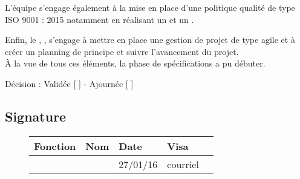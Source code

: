 \documentclass[asi, sansVersion]{picInsa}
\begin{document}
L'équipe \nomEquipe{} s'engage également à la mise en place d'une politique qualité de type ISO 9001 : 2015 notamment en réalisant un \PQ{} et un \PGC{}.

Enfin, le \CP{}, \Sergi{}, s'engage à mettre en place une gestion de projet de type agile et à créer un planning de principe et suivre l'avancement du projet. \\


À la vue de tous ces éléments, la phase de spécifications a pu débuter.

\begin{center}
Décision : Validée [ \checkmark{} ] - Ajournée [ ]
\end{center}

\subsection*{Signature}
\begin{figure}[H]
		\centering
		\begin{tabularx}{17cm}{|p{4cm}|X|X|X|X|}
		\hline
		\rowcolor[gray]{0.85} Fonction & Nom & Date & Visa \\
		\hline
		\CP{} & \Sergi{} & 27/01/16 & courriel\\
		\hline
		\end{tabularx}
\end{figure}
\end{document}
